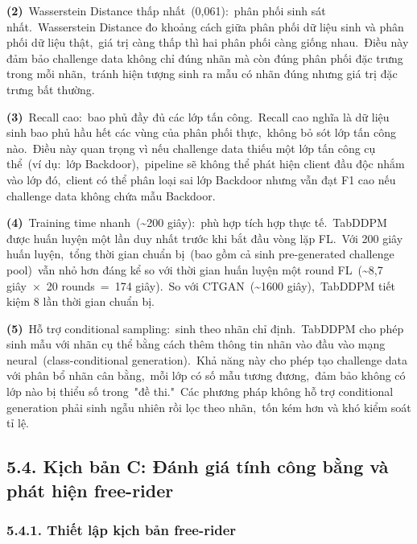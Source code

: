 \textbf{(2)}~Wasserstein Distance thấp nhất~(0,061):~phân phối sinh sát nhất.~Wasserstein Distance đo khoảng cách giữa phân phối dữ liệu sinh và phân phối dữ liệu thật,~giá trị càng thấp thì hai phân phối càng giống nhau.~Điều này đảm bảo challenge data không chỉ đúng nhãn mà còn đúng phân phối đặc trưng trong mỗi nhãn,~tránh hiện tượng sinh ra mẫu có nhãn đúng nhưng giá trị đặc trưng bất thường.

\textbf{(3)}~Recall cao:~bao phủ đầy đủ các lớp tấn công.~Recall cao nghĩa là dữ liệu sinh bao phủ hầu hết các vùng của phân phối thực,~không bỏ sót lớp tấn công nào.~Điều này quan trọng vì nếu challenge data thiếu một lớp tấn công cụ thể~(ví dụ:~lớp Backdoor),~pipeline sẽ không thể phát hiện client đầu độc nhắm vào lớp đó,~client có thể phân loại sai lớp Backdoor nhưng vẫn đạt F1 cao nếu challenge data không chứa mẫu Backdoor.

\textbf{(4)}~Training time nhanh~(\textasciitilde200 giây):~phù hợp tích hợp thực tế.~TabDDPM được huấn luyện một lần duy nhất trước khi bắt đầu vòng lặp FL.~Với 200 giây huấn luyện,~tổng thời gian chuẩn bị~(bao gồm cả sinh pre-generated challenge pool)~vẫn nhỏ hơn đáng kể so với thời gian huấn luyện một round FL~(\textasciitilde8,7 giây~×~20 rounds~=~174 giây).~So với CTGAN~(\textasciitilde1600 giây),~TabDDPM tiết kiệm 8 lần thời gian chuẩn bị.

\textbf{(5)}~Hỗ trợ conditional sampling:~sinh theo nhãn chỉ định.~TabDDPM cho phép sinh mẫu với nhãn cụ thể bằng cách thêm thông tin nhãn vào đầu vào mạng neural~(class-conditional generation).~Khả năng này cho phép tạo challenge data với phân bổ nhãn cân bằng,~mỗi lớp có số mẫu tương đương,~đảm bảo không có lớp nào bị thiểu số trong~"đề thi."~Các phương pháp không hỗ trợ conditional generation phải sinh ngẫu nhiên rồi lọc theo nhãn,~tốn kém hơn và khó kiểm soát tỉ lệ.

\subsection{5.4. Kịch bản C: Đánh giá tính công bằng và phát hiện free-rider}\label{kux1ecbch-bux1ea3n-c-ux111uxe1nh-giuxe1-tuxednh-cuxf4ng-bux1eb1ng-vuxe0-phuxe1t-hiux1ec7n-free-rider}

\subsubsection{5.4.1. Thiết lập kịch bản free-rider}\label{thiux1ebft-lux1eadp-kux1ecbch-bux1ea3n-free-rider}

